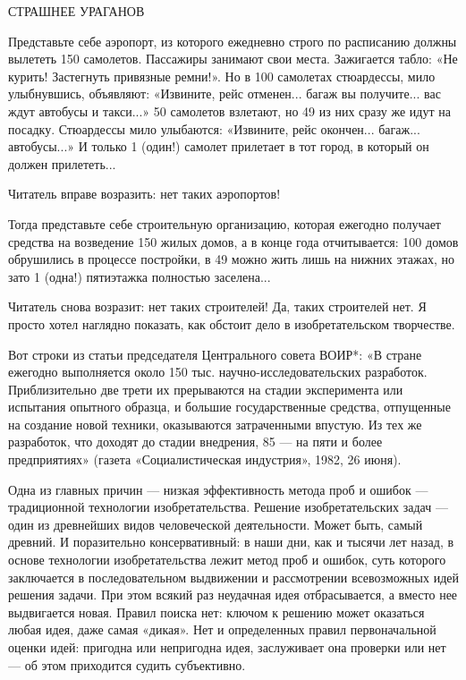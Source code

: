 СТРАШНЕЕ УРАГАНОВ

Представьте себе аэропорт, из  которого ежедневно строго по расписанию
должны  вылететь   150  самолетов.  Пассажиры  занимают   свои  места.
Зажигается табло: «Не  курить! Застегнуть привязные ремни!».  Но в 100
самолетах  стюардессы, мило  улыбнувшись,  объявляют: «Извините,  рейс
отменен...  багаж вы  получите...  вас ждут  автобусы  и такси...»  50
самолетов взлетают, но 49 из них  сразу же идут на посадку. Стюардессы
мило  улыбаются: «Извините,  рейс окончен...  багаж... автобусы...»  И
только 1  (один!) самолет прилетает в  тот город, в который  он должен
прилететь...

Читатель вправе возразить: нет таких аэропортов!

Тогда  представьте  себе  строительную организацию,  которая  ежегодно
получает  средства на  возведение  150  жилых домов,  а  в конце  года
отчитывается: 100  домов обрушились в  процессе постройки, в  49 можно
жить лишь  на нижних  этажах, но зато  1 (одна!)  пятиэтажка полностью
заселена...

Читатель снова  возразит: нет  таких строителей! Да,  таких строителей
нет.  Я   просто  хотел   наглядно  показать,   как  обстоит   дело  в
изобретательском творчестве.

Вот  строки  из  статьи  председателя Центрального  совета  ВОИР*:  «В
стране  ежегодно выполняется  около 150  тыс. научно-исследовательских
разработок.  Приблизительно   две  трети  их  прерываются   на  стадии
эксперимента или испытания опытного образца, и большие государственные
средства,   отпущенные   на   создание  новой   техники,   оказываются
затраченными  впустую. Из  тех же  разработок, что  доходят до  стадии
внедрения, 85%
— на пяти и  более предприятиях» (газета «Социалистическая индустрия»,
1982, 26 июня).

Одна из главных  причин — низкая эффективность метода проб  и ошибок —
традиционной  технологии  изобретательства.  Решение  изобретательских
задач  — один  из  древнейших видов  человеческой деятельности.  Может
быть, самый древний. И поразительно  консервативный: в наши дни, как и
тысячи  лет назад,  в основе  технологии изобретательства  лежит метод
проб и ошибок, суть которого заключается в последовательном выдвижении
и рассмотрении всевозможных  идей решения задачи. При  этом всякий раз
неудачная идея  отбрасывается, а вместо нее  выдвигается новая. Правил
поиска  нет:  ключом  к  решению  может  оказаться  любая  идея,  даже
самая «дикая».  Нет и определенных правил  первоначальной оценки идей:
пригодна или  непригодна идея, заслуживает  она проверки или нет  — об
этом приходится судить субъективно.

